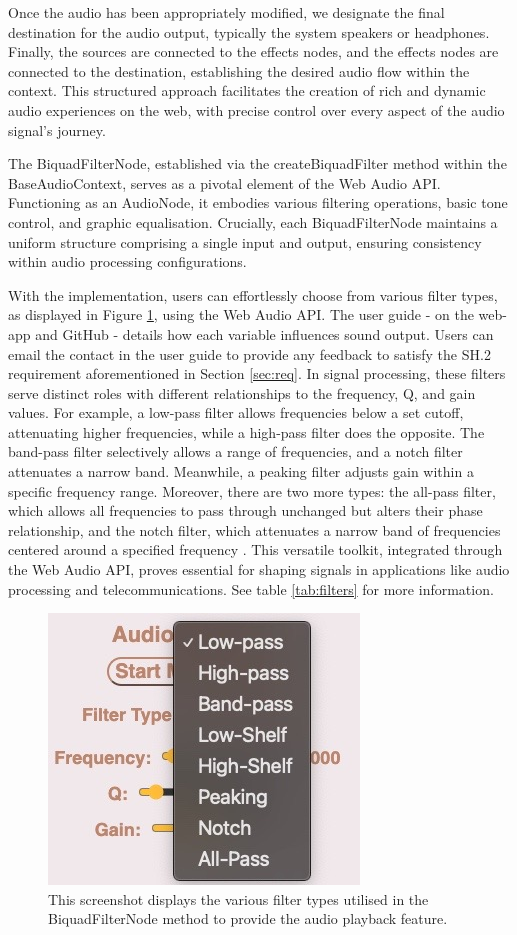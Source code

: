 \documentclass{l4proj}
\begin{document}
Once the audio has been appropriately modified, we designate the final destination for the audio output, typically the system speakers or headphones. Finally, the sources are connected to the effects nodes, and the effects nodes are connected to the destination, establishing the desired audio flow within the context. This structured approach facilitates the creation of rich and dynamic audio experiences on the web, with precise control over every aspect of the audio signal's journey.

The BiquadFilterNode, established via the createBiquadFilter method within the BaseAudioContext, serves as a pivotal element of the Web Audio API. Functioning as an AudioNode, it embodies various filtering operations, basic tone control, and graphic equalisation. Crucially, each BiquadFilterNode maintains a uniform structure comprising a single input and output, ensuring consistency within audio processing configurations.

With the implementation, users can effortlessly choose from various filter types, as displayed in Figure \ref{fig:filter-type}, using the Web Audio API. The user guide - on the web-app and GitHub - details how each variable influences sound output. Users can email the contact in the user guide to provide any feedback to satisfy the SH.2 requirement aforementioned in Section \ref{sec:req}. In signal processing, these filters serve distinct roles with different relationships to the frequency, Q, and gain values. For example, a low-pass filter allows frequencies below a set cutoff, attenuating higher frequencies, while a high-pass filter does the opposite. The band-pass filter selectively allows a range of frequencies, and a notch filter attenuates a narrow band. Meanwhile, a peaking filter adjusts gain within a specific frequency range. Moreover, there are two more types: the all-pass filter, which allows all frequencies to pass through unchanged but alters their phase relationship, and the notch filter, which attenuates a narrow band of frequencies centered around a specified frequency \citep{MozDevNet_filters}. This versatile toolkit, integrated through the Web Audio API, proves essential for shaping signals in applications like audio processing and telecommunications. See table \ref{tab:filters} for more information.

\begin{figure}
    \centering
    \includegraphics[width=0.4\linewidth]{dissertation/images/filter-type.jpeg}    
    \caption{This screenshot displays the various filter types utilised in the BiquadFilterNode method to provide the audio playback feature.}
    \label{fig:filter-type} 
\end{figure}
\end{document}
